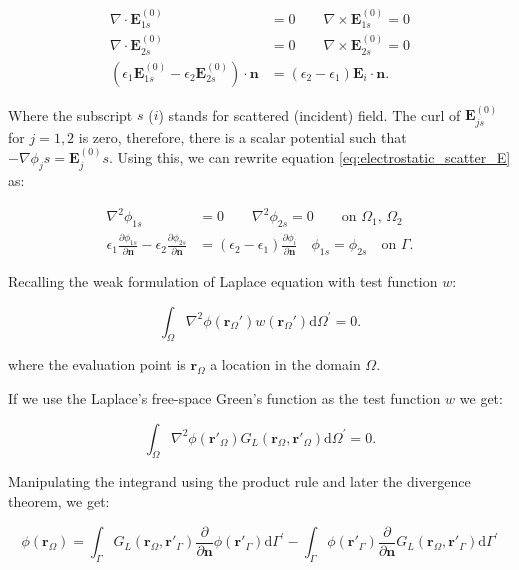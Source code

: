 \begin{align} \label{eq:electrostatic_scatter_E}
\nabla \cdot \mathbf{E}^{(0)}_{1s} &= 0 \qquad \nabla \times \mathbf{E}^{(0)}_{1s} = 0 \nonumber \\
\nabla \cdot \mathbf{E}^{(0)}_{2s} &= 0 \qquad \nabla \times \mathbf{E}^{(0)}_{2s} = 0 \nonumber \\
(\epsilon_1\mathbf{E}^{(0)}_{1s} - \epsilon_2\mathbf{E}^{(0)}_{2s})\cdot\mathbf{n} &= (\epsilon_2-\epsilon_1)\mathbf{E}_i\cdot \mathbf{n}.
\end{align}

Where the subscript $s$ ($i$) stands for scattered (incident) field. The curl of
$\mathbf{E}^{(0)}_{js}$ for $j=1,2$ is zero, therefore, there is a scalar potential
such that $-\nabla \phi_js = \mathbf{E}^{(0)}_js$. Using this, we can rewrite 
equation \eqref{eq:electrostatic_scatter_E} as:

\begin{align} \label{eq:electrostatic_scatter}
\nabla^2 \phi_{1s} &= 0 \qquad \nabla^2 \phi_{2s} = 0 \qquad\text{on $\Omega_1$, $\Omega_2$} \nonumber \\
\epsilon_1\frac{\partial\phi_{1s}}{\partial \mathbf{n}} - \epsilon_2\frac{\partial\phi_{2s}}{\partial\mathbf{n}} &= (\epsilon_2-\epsilon_1)\frac{\partial\phi_i}{\partial\mathbf{n}} \quad \phi_{1s} = \phi_{2s} \quad \text{on $\Gamma$}.
\end{align}


Recalling the weak formulation of Laplace equation with test function $w$:

\begin{equation} \label{eq:lap_weak}
\int_\Omega \nabla^2 \phi(\mathbf{r}_\Omega') w(\mathbf{r}_\Omega') \text{d} \Omega^\prime= 0.
\end{equation}

\noindent where the evaluation point is $\mathbf{r}_\Omega$ a location in the domain $\Omega$.

If we use the Laplace's free-space Green's function as the test function $w$ we
get:

\begin{equation} \label{eq:lap_weak2}
\int_\Omega \nabla^2 \phi(\mathbf{r}'_\Omega) G_L(\mathbf{r}_\Omega,\mathbf{r}'_\Omega) \text{d} \Omega^\prime= 0.
\end{equation}

Manipulating the integrand using the product rule and later the divergence 
theorem, we get:

\begin{equation} \label{eq:lap_bie_dom}
\phi(\mathbf{r}_\Omega) = \int_\Gamma G_L(\mathbf{r}_\Omega,\mathbf{r}'_\Gamma)  \frac{\partial} {\partial \mathbf{n}} \phi(\mathbf{r}'_\Gamma)  \text{d} \Gamma^\prime - \int_\Gamma \phi(\mathbf{r}'_\Gamma)  \frac{\partial}{\partial \mathbf{n}} G_L(\mathbf{r}_\Omega,\mathbf{r}'_\Gamma) \text{d} \Gamma^\prime
\end{equation}

